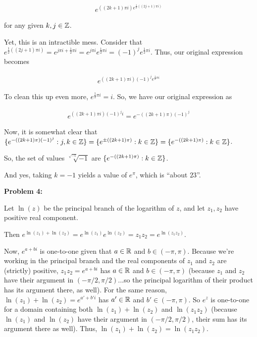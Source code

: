 \documentclass[a4paper,12pt]{article}
\begin{document}
\begin{align*}
e^{((2k+1)\pi i)e^{\frac{1}{2}((2j+1)\pi i)}} 
\end{align*} %

for any given $k, j \in \mathbb{Z}$.

Yet, this is an intractible mess. Consider that $e^{\frac{1}{2}((2j+1)\pi i)} = e^{j \pi i + \frac{1}{2} \pi i} = e^{j\pi i} e^{\frac{1}{2} \pi i} = (-1)^j e^{\frac{1}{2} \pi i}$. Thus, our original expression becomes

\begin{align*}
e^{((2k+1)\pi i)(-1)^j e^{\frac{1}{2} \pi i}} 
\end{align*}

To clean this up even more, $e^{\frac{1}{2} \pi i}=i$. So, we have our original expression as 

\begin{align*}
e^{((2k+1)\pi i)(-1)^j i}  = e^{-((2k+1)\pi)(-1)^j}
\end{align*}

Now, it is somewhat clear that $\{e^{-((2k+1)\pi)(-1)^j}: j, k \in \mathbb{Z} \} = \{ e^{ \pm ((2k+1)\pi)}: k \in \mathbb{Z} \} = \{e^{-((2k+1)\pi)}: k \in \mathbb{Z} \}$.

So, the set of values $\sqrt[\sqrt{-1}]{-1}$ are $\{e^{-((2k+1)\pi)}: k \in \mathbb{Z} \}$. 

And yes, taking $k=-1$ yields a value of $e^\pi$, which is ``about $23$''.

\shunt

{\bf Problem 4:}

Let $\ln(z)$ be the principal branch of the logarithm of $z$, and let $z_1, z_2$ have positive real component.

Then $e^{\ln(z_1)+\ln(z_2)} = e^{\ln(z_1)}e^{\ln(z_2)} = z_1z_2 = e^{\ln(z_1z_2)}$.

Now, $e^{a+bi}$ is one-to-one given that $a \in \mathbb{R}$ and $b \in (-\pi,\pi)$. Because we're working in the principal branch and the real components of $z_1$ and $z_2$ are (strictly) positive, $z_1z_2 = e^{a+bi}$ has $a \in \mathbb{R}$ and $b \in (-\pi,\pi)$ (because $z_1$ and $z_2$ have their argument in $(-\pi/2,\pi/2)$...so the principal logarithm of their product has its argument there, as well). For the same reason, $\ln(z_1)+\ln(z_2) = e^{a'+b'i}$ has $a' \in \mathbb{R}$ and $b' \in (-\pi, \pi)$. So $e^{z}$ is one-to-one for a domain containing both $\ln(z_1)+\ln(z_2)$ and $\ln(z_1z_2)$ (because $\ln(z_1)$ and $\ln(z_2)$ have their argument in $(-\pi/2,\pi/2)$, their sum has its argument there as well). Thus, $\ln(z_1)+\ln(z_2) = \ln(z_1z_2)$.
\end{document}
